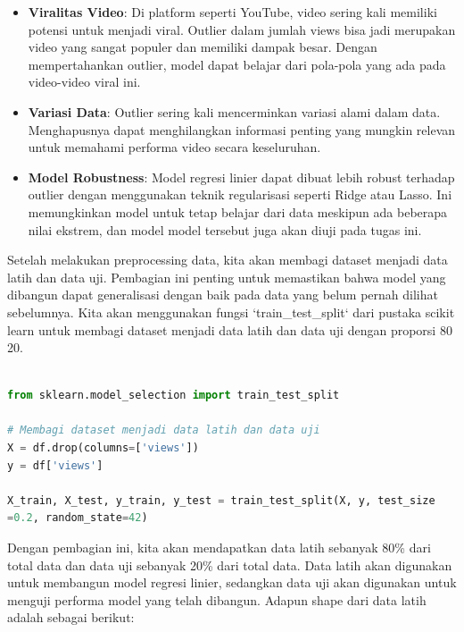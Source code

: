 \begin{itemize}
    \item \textbf{Viralitas Video}: Di platform seperti YouTube, video sering kali memiliki potensi untuk menjadi viral. Outlier dalam jumlah views bisa jadi merupakan video yang sangat populer dan memiliki dampak besar. Dengan mempertahankan outlier, model dapat belajar dari pola-pola yang ada pada video-video viral ini.
    
    \item \textbf{Variasi Data}: Outlier sering kali mencerminkan variasi alami dalam data. Menghapusnya dapat menghilangkan informasi penting yang mungkin relevan untuk memahami performa video secara keseluruhan.
    
    \item \textbf{Model Robustness}: Model regresi linier dapat dibuat lebih robust terhadap outlier dengan menggunakan teknik regularisasi seperti Ridge atau Lasso. Ini memungkinkan model untuk tetap belajar dari data meskipun ada beberapa nilai ekstrem, dan model model tersebut juga akan diuji pada tugas ini.
\end{itemize}

Setelah melakukan preprocessing data, kita akan membagi dataset menjadi data latih dan data uji. Pembagian ini penting untuk memastikan bahwa model yang dibangun dapat generalisasi dengan baik pada data yang belum pernah dilihat sebelumnya. Kita akan menggunakan fungsi `train\_test\_split` dari pustaka scikit learn untuk membagi dataset menjadi data latih dan data uji dengan proporsi 80 20.

\begin{lstlisting}[language=Python, caption=Pembagian Data Latih dan Data Uji]

from sklearn.model_selection import train_test_split

# Membagi dataset menjadi data latih dan data uji
X = df.drop(columns=['views'])
y = df['views']

X_train, X_test, y_train, y_test = train_test_split(X, y, test_size
=0.2, random_state=42)
\end{lstlisting}

Dengan pembagian ini, kita akan mendapatkan data latih sebanyak 80\% dari total data dan data uji sebanyak 20\% dari total data. Data latih akan digunakan untuk membangun model regresi linier, sedangkan data uji akan digunakan untuk menguji performa model yang telah dibangun. Adapun shape dari data latih adalah sebagai berikut:


